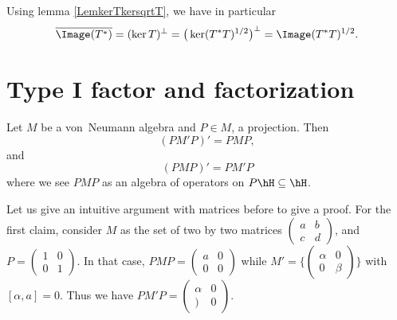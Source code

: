 Using lemma \ref{LemkerTkersqrtT}, we have in particular
\begin{equation}
\overline{ \Image(T^*) }=(\ker T)^{\perp}=\big( \ker(T^*T)^{1/2} \big)^{\perp}=\Image(T^*T)^{1/2}.
\end{equation}

					\section{Type I factor and factorization}

\begin{lemma}		\label{LemPMPPMPprime}
Let $M$ be a von~Neumann algebra and $P\in M$, a projection. Then
\begin{equation}
(PM'P)'=PMP,
\end{equation}
and 
\begin{equation}		\label{EqLemPMPPMPprimedeux}
(PMP)'=PM'P
\end{equation}
where we see $PMP$ as an algebra of operators on $P\hH\subseteq\hH$. 
\end{lemma}

Let us give an intuitive argument with matrices before to give a proof. For the first claim, consider $M$ as the set of two by two matrices 
$
\begin{pmatrix}
a&b\\
c&d
\end{pmatrix}
$, and $P=
\begin{pmatrix}
1&0\\
0&1
\end{pmatrix}$. In that case, $PMP=\begin{pmatrix}
a&0\\
0&0
\end{pmatrix}$ while $M'=\{ \begin{pmatrix}
\alpha&0\\
0&\beta
\end{pmatrix}\}$ with $[\alpha,a]=0$. Thus we have $PM'P=\begin{pmatrix}
\alpha&0\\
)&0
\end{pmatrix}$.

